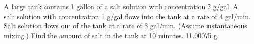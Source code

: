 {
A large tank contains 1 gallon of a salt solution with concentration 2 g/gal.  A salt solution with concentration 1 g/gal flows into the tank at a rate of 4 gal/min.  Salt solution flows out of the tank at a rate of 3 gal/min.  (Assume instantaneous mixing.) Find the amount of salt in the tank at 10 minutes.
}
{
11.00075 g
}
